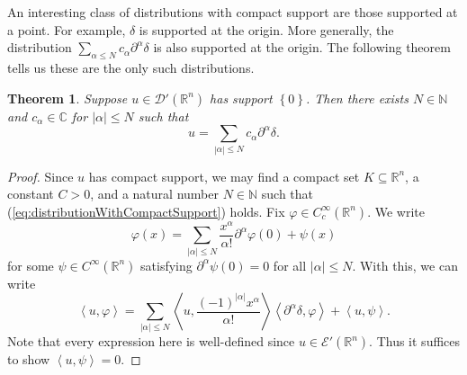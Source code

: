 \documentclass{book}
\newcommand{\scrD}{\mathscr{D}}
\newcommand{\scrE}{\mathscr{E}}
\newcommand{\bbC}{\mathbb{C}}
\newcommand{\bbN}{\mathbb{N}}
\newcommand{\bbR}{\mathbb{R}}
\renewcommand{\phi}{\varphi}
\newcommand{\abs}[1]{\left\lvert {#1} \right\rvert}
\newcommand{\set}[1]{\left\{ {#1} \right\}}
\newcommand{\angles}[1]{\left\langle {#1} \right\rangle}
\newtheorem{theorem}{Theorem}[chapter]
\theoremstyle{definition}
\theoremstyle{remark}
\numberwithin{equation}{chapter}
\begin{document}
An interesting class of distributions with compact support are those supported at a point. For example, $\delta$ is supported at the origin. More generally, the distribution $\sum_{\alpha \leq N} c_\alpha \partial^\alpha \delta$ is also supported at the origin. The following theorem tells us these are the only such distributions.
\begin{theorem}
    Suppose $u \in \scrD'(\bbR^n)$ has support $\set{0}$. Then there exists $N \in \bbN$ and $c_\alpha \in \bbC$ for $\abs{\alpha} \leq N$ such that 
    \begin{equation}
        u = \sum_{\abs{\alpha} \leq N} c_\alpha \partial^\alpha \delta.
    \end{equation}
\end{theorem}
\begin{proof}
    Since $u$ has compact support, we may find a compact set $K \subseteq \bbR^n$, a constant $C > 0$, and a natural number $N \in \bbN$ such that (\ref{eq:distributionWithCompactSupport}) holds. Fix $\phi \in C_c^\infty(\bbR^n)$. We write 
    \begin{equation}
        \phi(x) = \sum_{\abs{\alpha} \leq N} \frac{x^\alpha}{\alpha!} \partial^\alpha \phi(0) + \psi(x)
    \end{equation}
    for some $\psi \in C^\infty(\bbR^n)$ satisfying $\partial^\alpha \psi(0) = 0$ for all $\abs{\alpha} \leq N$. With this, we can write 
    \begin{equation}
        \angles{ u,\phi } = \sum_{\abs{\alpha} \leq N} \angles{ u, \frac{(-1)^{\abs{\alpha}} x^\alpha}{\alpha!} } \angles{ \partial^\alpha \delta, \phi } + \angles{ u, \psi }.
    \end{equation}
    Note that every expression here is well-defined since $u \in \scrE'(\bbR^n)$. Thus it suffices to show $\angles{ u,\psi } = 0$.


\end{proof}
\end{document}

